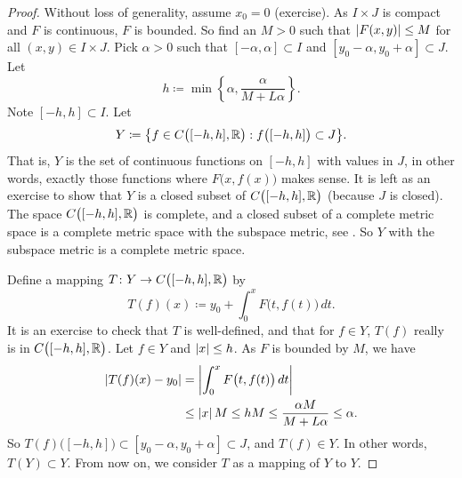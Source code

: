 \begin{proof}
Without loss of generality, assume $x_0 =0$ (exercise).
As $I \times J$ is compact and
$F$ is continuous, $F$ is bounded.
So find an $M > 0$ such that
$\left\lvert {F(x,y)} \right\rvert \leq M$ for all $(x,y) \in I\times J$.
Pick $\alpha > 0$ such that
$[-\alpha,\alpha] \subset I$ and $[y_0-\alpha, y_0 + \alpha] \subset J$.
Let
\begin{equation*}
h \coloneqq \min \left\{ \alpha, \frac{\alpha}{M+L\alpha} \right\} .
\end{equation*}
Note $[-h,h] \subset I$.  Let
\begin{equation*}
Y \coloneqq \bigl\{ f \in C\bigl([-h,h],{\mathbb{R}}\bigr) : f\bigl([-h,h]\bigr) \subset J \bigr\} .
\end{equation*}
That is, $Y$ is the set of continuous functions on $[-h,h]$ with values in
$J$, in other words,
exactly those functions where $F\bigl(x,f(x)\bigr)$ makes sense.
It is left as an exercise to show that $Y$ is a closed subset of $C\bigl([-h,h],{\mathbb{R}}\bigr)$
(because $J$ is closed).
The space $C\bigl([-h,h],{\mathbb{R}}\bigr)$ is complete, and
a closed subset of a complete metric space is a complete metric space with
the subspace metric, see .  So $Y$ with the
subspace metric is a complete metric space.

Define a mapping
$T \colon Y \to C\bigl([-h,h],{\mathbb{R}}\bigr)$ by
\begin{equation*}
T(f)(x)
\coloneqq
y_0 + \int_0^x F\bigl(t,f(t)\bigr)\,dt .
\end{equation*}
It is an exercise to check that
$T$ is well-defined, and that for $f \in Y$, $T(f)$ really is in $C\bigl([-h,h],{\mathbb{R}}\bigr)$.
Let $f \in Y$ and $\left\lvert {x} \right\rvert \leq h$.
As $F$ is bounded by $M$, we have
\begin{equation*}
\begin{split}
\left\lvert {T(f)(x) - y_0} \right\rvert
&= \left\lvert {\int_0^x F\bigl(t,f(t)\bigr)\,dt} \right\rvert \\
& \leq 
\left\lvert {x} \right\rvert M \leq hM \leq \frac{\alpha M}{M+ L\alpha} \leq \alpha .
\end{split}
\end{equation*}
So $T(f)\bigl([-h,h]\bigr) \subset [y_0-\alpha,y_0+\alpha] \subset J$, and
$T(f) \in Y$.  In other words, $T(Y) \subset Y$.  From now on,
we consider $T$ as a mapping of $Y$ to $Y$.


\end{proof}
